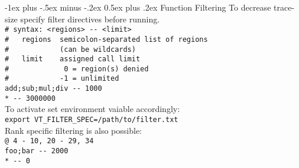 \documentclass[a4paper,10pt,landscape]{article}
\makeatletter
\renewcommand{\section}{\@startsection{section}{1}{0mm}%
                                {-1ex plus -.5ex minus -.2ex}%
                                {0.5ex plus .2ex}%
                                {\normalfont\large\bfseries}}
\makeatother
\begin{document}
\begin{multicols}{3}
\section{Function Filtering}
To decrease trace-size specify filter directives before running.\\
\verb!# syntax: <regions> -- <limit>!\\
\verb!#   regions  semicolon-separated list of regions!\\
\verb!#            (can be wildcards)!\\
\verb!#   limit    assigned call limit!\\
\verb!#             0 = region(s) denied!\\
\verb!#            -1 = unlimited!\\
\verb!add;sub;mul;div -- 1000!\\
\verb!* -- 3000000!\\
To activate set environment vaiable accordingly:\\
\texttt{export VT\_FILTER\_SPEC=/path/to/filter.txt}\\
Rank specific filtering is also possible:\\
\verb!@ 4 - 10, 20 - 29, 34!\\
\verb!foo;bar -- 2000!\\
\verb!* -- 0!\\


\end{multicols}
\end{document}
